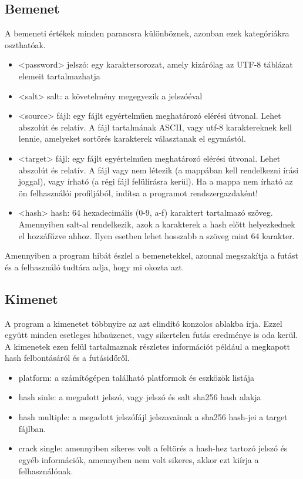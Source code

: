 \subsection{Bemenet}

A bemeneti értékek minden parancsra különböznek, azonban ezek kategóriákra oszthatóak.
%
\begin{itemize}
    \item <password> jelszó: egy karaktersorozat, amely kizárólag az UTF-8 táblázat elemeit tartalmazhatja
    \item <salt> salt: a követelmény megegyezik a jelszóéval
    \item <source> fájl: egy fájlt egyértelműen meghatározó elérési útvonal. Lehet abszolút és relatív. A fájl tartalmának ASCII, vagy utf-8 karaktereknek kell lennie, amelyeket sortörés karakterek választanak el egymástól.
    \item <target> fájl: egy fájlt egyértelműen meghatározó elérési útvonal. Lehet abszolút és relatív. A fájl vagy nem létezik (a mappában kell rendelkezni írási joggal), vagy írható (a régi fájl felülírásra kerül). Ha a mappa nem írható az ön felhasználói profiljából, indítsa a programot rendszergazdaként!
    \item <hash> hash: 64 hexadecimális (0-9, a-f) karaktert tartalmazó szöveg. Amennyiben salt-al rendelkezik, azok a karakterek a hash előtt helyezkednek el hozzáfűzve ahhoz. Ilyen esetben lehet hosszabb a szöveg mint 64 karakter.
\end{itemize}
%
Amennyiben a program hibát észlel a bemenetekkel, azonnal megszakítja a futást és a felhasználó tudtára adja, hogy mi okozta azt.






\subsection{Kimenet}

A program a kimenetet többnyire az azt elindító konzolos ablakba írja. Ezzel együtt minden esetleges hibaüzenet, vagy sikertelen futás eredménye is oda kerül. A kimenetek ezen felül tartalmaznak részletes információt például a megkapott hash felbontásáról és a futásidőről.
%
\begin{itemize}
    \item platform: a számítógépen található platformok és eszközök listája
    \item hash sinle: a megadott jelszó, vagy jelszó és salt sha256 hash alakja
    \item hash multiple: a megadott jelszófájl jelszavainak a sha256 hash-jei a target fájlban.
    \item crack single: amennyiben sikeres volt a feltörés a hash-hez tartozó jelszó és egyéb információk, amennyiben nem volt sikeres, akkor ezt kiírja a felhasználónak.
\end{itemize}





